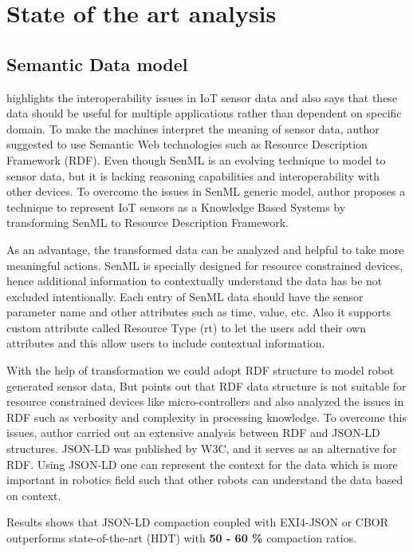 

	\chapter{State of the art analysis}
	
	\section{Semantic Data model}
	\citet{su2014connecting} highlights the interoperability issues in IoT sensor data and also says that these data should be useful for multiple applications rather than dependent on specific domain. To make the machines interpret the meaning of sensor data, author suggested to use Semantic Web technologies such as Resource Description Framework (RDF). Even though SenML is an evolving technique to model to sensor data, but it is lacking reasoning capabilities and interoperability with other devices. To overcome the issues in SenML generic model, author proposes a technique to represent IoT sensors as a Knowledge Based Systems by transforming SenML to Resource Description Framework. 
	
	As an advantage, the transformed data can be analyzed and helpful to take more meaningful actions. 
	SenML is specially designed for resource constrained devices, hence additional information to contextually understand the data has be not excluded intentionally. Each entry of SenML data should have the sensor parameter name and other attributes such as time, value, etc. Also it supports custom attribute called Resource Type (rt) to let the users add their own attributes and this allow users to include contextual information.
	
	With the help of transformation we could adopt RDF structure to model robot generated sensor data, But \citet{charpenay2018towards} points out that RDF data structure is not suitable for resource constrained devices like micro-controllers and also analyzed the issues in RDF such as verbosity and complexity in processing knowledge. To overcome this issues, author carried out an extensive analysis between RDF and JSON-LD structures. JSON-LD was published by W3C, and it serves as an alternative for RDF. Using JSON-LD one can represent the context for the data which is more important in robotics field such that other robots can understand the data based on context.
	
	Results shows that JSON-LD compaction coupled with EXI4-JSON or CBOR outperforms state-of-the-art (HDT) with \textbf{50 - 60 \% }compaction ratios.
	
